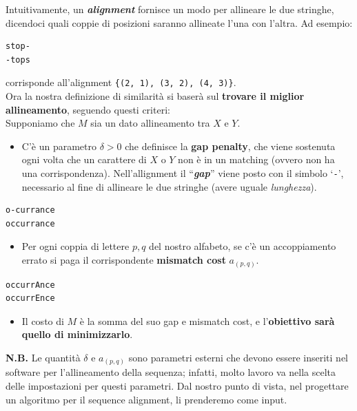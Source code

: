 Intuitivamente, un \textbf{\emph{alignment}} fornisce un modo per
allineare le due stringhe, dicendoci quali coppie di posizioni saranno
allineate l'una con l'altra. Ad esempio:

\begin{verbatim}
stop-
-tops
\end{verbatim}

corrisponde all'alignment \texttt{\{(2,\ 1),\ (3,\ 2),\ (4,\ 3)\}}.\\

Ora la nostra definizione di similarità si baserà sul \textbf{trovare il
	miglior allineamento}, seguendo questi criteri:\\

Supponiamo che $M$ sia un dato allineamento tra $X$ e $Y$.

\begin{itemize}
	\item
	      C'è un parametro $\delta>0$ che definisce la \textbf{gap penalty},
	      che viene sostenuta ogni volta che un carattere di $X$ o $Y$ non è
	      in un matching (ovvero non ha una corrispondenza). Nell'allignment il
	      ``\textbf{\emph{gap}}'' viene posto con il simbolo `\texttt{-}',
	      necessario al fine di allineare le due stringhe (avere uguale
	      \emph{lunghezza}).
\end{itemize}

\begin{verbatim}
o-currance
occurrance
\end{verbatim}

\begin{itemize}
	\item
	      Per ogni coppia di lettere $p,q$ del nostro alfabeto, se c'è un
	      accoppiamento errato si paga il corrispondente \textbf{mismatch cost}
	      $a_{(p,q)}$.
\end{itemize}

\begin{verbatim}
occurrAnce
occurrEnce
\end{verbatim}

\begin{itemize}
	\item
	      Il costo di $M$ è la somma del suo gap e mismatch cost, e
	      l'\textbf{obiettivo sarà quello di minimizzarlo}.
\end{itemize}

\textbf{N.B.} Le quantità $\delta$ e $a_{(p,q)}$ sono parametri
esterni che devono essere inseriti nel software per l'allineamento della
sequenza; infatti, molto lavoro va nella scelta delle impostazioni per
questi parametri. Dal nostro punto di vista, nel progettare un algoritmo
per il sequence alignment, li prenderemo come input.

